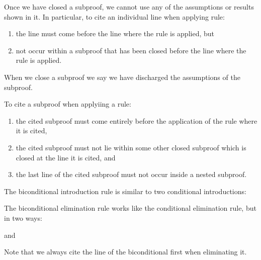 \begin{remark}
    Once we have closed a subproof, we cannot use any of the assumptions or results shown in it. In particular, to cite an individual line when applying rule: \begin{enumerate}
        \item the line must come before the line where the rule is applied, but
        \item not occur within a subproof that has been closed before the line where the rule is applied.
    \end{enumerate}
    When we close a subproof we say we have discharged the assumptions of the subproof.
\end{remark}


\begin{remark}
    To cite a subproof when applyiing a rule: \begin{enumerate}
        \item the cited subproof must come entirely before the application of the rule where it is cited,
        \item the cited subproof must not lie within some other closed subproof which is closed at the line it is cited, and 
        \item the last line of the cited subproof must not occur inside a nested subproof.
    \end{enumerate}
\end{remark}

\begin{definition}
    The biconditional introduction rule is similar to two conditional introductions: \begin{fitchproof}
        \open
        \close
        \open 
        \close
         
    \end{fitchproof}
\end{definition}

\begin{definition}
    The biconditional elimination rule works like the conditional elimination rule, but in two ways: \begin{fitchproof}
         
    \end{fitchproof}
    and \begin{fitchproof}
         
    \end{fitchproof}
    Note that we always cite the line of the biconditional first when eliminating it.
\end{definition}



